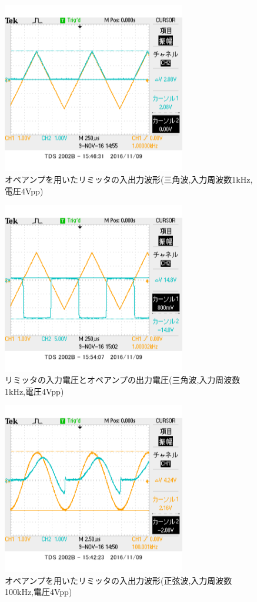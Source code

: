 \documentclass[11pt,a4j]{jsarticle}
\begin{document}
 \begin{figure}[htbp]
  \centering
  \includegraphics[width=8cm,clip]{1_1_ampFG_f1V4sankaku_ViVo.png}
  \caption{オペアンプを用いたリミッタの入出力波形(三角波,入力周波数1kHz,電圧4Vpp)}
  \label{fig:ampFGf1v4vivo}
 \end{figure}%
 
 \begin{figure}[htbp]
  \centering
  \includegraphics[width=8cm,clip]{1_1_ampFG_f1V4sankaku_ViVa.png}
  \caption{リミッタの入力電圧とオペアンプの出力電圧(三角波,入力周波数1kHz,電圧4Vpp)}
  \label{fig:ampFGf1v4viva}
 \end{figure}%
 
 \begin{figure}[htbp]
  \centering
  \includegraphics[width=8cm,clip]{1_1_ampFG_f100V4_ViVo.png}
  \caption{オペアンプを用いたリミッタの入出力波形(正弦波,入力周波数100kHz,電圧4Vpp)}
  \label{fig:ampFGf100v4}
 \end{figure}%
  
\end{document}
